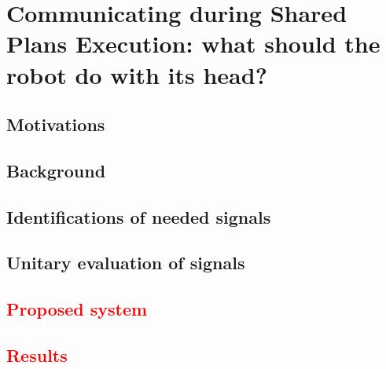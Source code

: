 \documentclass[english,a4paper,11pt,twoside]{StyleThese}
\begin{document}
\setcounter{chapter}{5} %
\dominitoc
\faketableofcontents
\fi

\chapter{Communicating during Shared Plans Execution: what should the robot do with its head?}
\minitoc

\label{ch:Acting}

\section{Motivations}

\section{Background}

\section{Identifications of needed signals}

\section{Unitary evaluation of signals}

\section{\textcolor{red}{Proposed system}}

\section{\textcolor{red}{Results}}


\ifdefined{}
\else


\end{document}
